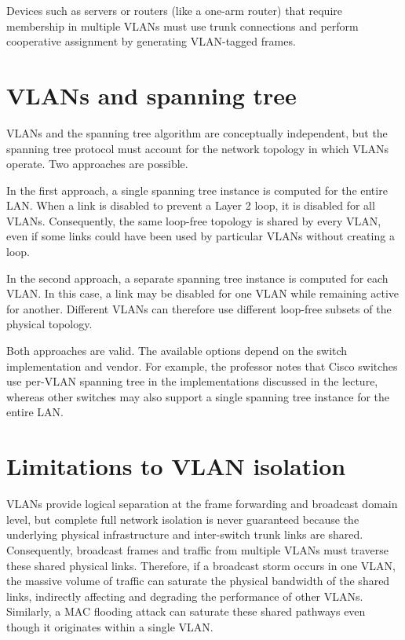 Devices such as servers or routers (like a one-arm router) that require membership in multiple VLANs must use trunk connections and perform cooperative assignment by generating VLAN-tagged frames.


\section{VLANs and spanning tree}

VLANs and the spanning tree algorithm are conceptually independent, but the spanning tree protocol must account for the network topology in which VLANs operate. Two approaches are possible.

In the first approach, a single spanning tree instance is computed for the entire LAN. When a link is disabled to prevent a Layer 2 loop, it is disabled for all VLANs. Consequently, the same loop-free topology is shared by every VLAN, even if some links could have been used by particular VLANs without creating a loop.

In the second approach, a separate spanning tree instance is computed for each VLAN. In this case, a link may be disabled for one VLAN while remaining active for another. Different VLANs can therefore use different loop-free subsets of the physical topology.

Both approaches are valid. The available options depend on the switch implementation and vendor. For example, the professor notes that Cisco switches use per-VLAN spanning tree in the implementations discussed in the lecture, whereas other switches may also support a single spanning tree instance for the entire LAN.

\begin{center}
\end{center}
\section{Limitations to VLAN isolation}

VLANs provide logical separation at the frame forwarding and broadcast domain level, but complete full network isolation is never guaranteed because the underlying physical infrastructure and inter-switch trunk links are shared. Consequently, broadcast frames and traffic from multiple VLANs must traverse these shared physical links. Therefore, if a broadcast storm occurs in one VLAN, the massive volume of traffic can saturate the physical bandwidth of the shared links, indirectly affecting and degrading the performance of other VLANs. Similarly, a MAC flooding attack can saturate these shared pathways even though it originates within a single VLAN.

